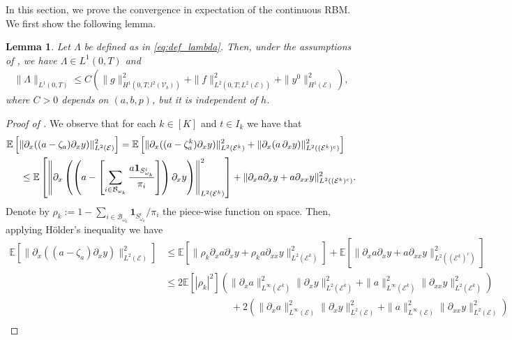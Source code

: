 \documentclass[a4paper, 10pt, english]{article}
\newtheorem{lemma}{Lemma}[section]
\begin{document}
In this section, we prove the convergence in expectation of the continuous RBM. We first show the following lemma.

\begin{lemma}\label{lemma:lambda_bounded}
Let $\Lambda$ be defined as in \eqref{eq:def_lambda}. Then, under the assumptions of , we have $\Lambda \in L^1(0,T)$ and
    \begin{align*}
        \|\Lambda\|_{L^1(0, T)} \leq C \left( \|g\|_{H^1(0, T; l^2(\mathcal{V}_b))}^2 + \|f\|_{L^2(0, T; L^2(\mathcal{E}))}^2 + \|y^0\|_{H^1(\mathcal{E})}^2 \right),
    \end{align*}
    where $C > 0$ depends on $(a,b,p)$, but it is independent of $h$.
\end{lemma}
\begin{proof}[Proof of ]
We observe that for each $k\in [K]$ and $t\in I_k$ we have that
\begin{align*}
&\mathbb{E}\left[\|\partial_{x}((a - \zeta_a) \partial_x y)\|_{L^2(\mathcal{E})}^2\right]  = \mathbb{E}\left[\|\partial_{x}((a - \zeta_a^k) \partial_x y)\|_{L^2(\mathcal{E}^k)}^2+\|\partial_{x}( a \,\partial_x y)\|_{L^2((\mathcal{E}^k)^c)}^2\right]\\
&\hspace{0.5cm} \leq \mathbb{E}\left[\left\|\partial_{x}\left(\left(a - \left[\sum_{i\in \mathcal{B}_{\omega_k}}\frac{a\mathbf 1_{S^{i}_{\omega_k}}}{\pi_i}\right]\right) \partial_x y\right)\right\|_{L^2(\mathcal{E}^k)}^2\right]+\|\partial_{x}a \partial_x y + a\partial_{xx}y\|_{L^2((\mathcal{E}^k)^c)}^2.
\end{align*}
Denote by $ \rho_k := 1 - \sum_{i\in \mathcal{B}_{\omega_k}}\mathbf 1_{S^{i}_{\omega_k}}/\pi_i$ the piece-wise function on space. Then, applying H\"older's inequality we have 
\begin{align*}
\mathbb{E}\left[\|\partial_{x}((a - \zeta_a) \partial_x y)\|_{L^2(\mathcal{E})}^2\right] &\leq \mathbb{E}\left[\|\rho_k\partial_{x}a \partial_x y+\rho_ka\partial_{xx}y\|_{L^2(\mathcal{E}^k)}^2\right]+\mathbb{E}\left[\|\partial_{x}a \partial_x y + a\partial_{xx}y\|_{L^2((\mathcal{E}^k)^c)}^2\right]\\
    &\leq2\mathbb{E}[|\rho_k|^2]\left(\|\partial_x a\|_{L^\infty(\mathcal{E}^k)}^2\|\partial_x y \|_{L^2(\mathcal{E}^k)}^2 +\|a\|_{L^\infty(\mathcal{E}^k)}^2\|\partial_{xx}y\|^2_{L^2(\mathcal{E}^k)} \right)\\
    &\hspace{2cm}\qquad+ 2\left(\|\partial_x a\|_{L^\infty(\mathcal{E})}^2\|\partial_x y\|_{L^2(\mathcal{E})}^2+ \| a\|_{L^\infty(\mathcal{E})}^2\|\partial_{xx} y\|_{L^2(\mathcal{E})}^2\right)\\

\end{align*}
\end{proof}
\end{document}
